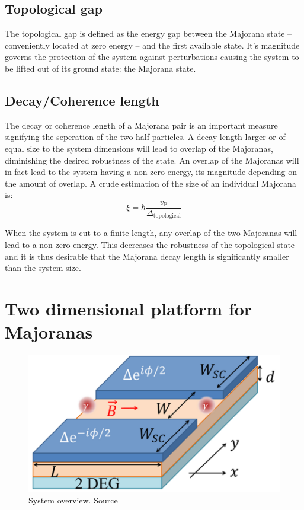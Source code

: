 	\subsection{Topological gap}
		The topological gap is defined as the energy gap between the Majorana state -- conveniently located at zero energy -- and the first available state.
		It's magnitude governs the protection of the system against perturbations causing the system to be lifted out of its ground state: the Majorana state.

	\subsection{Decay/Coherence length}
		The decay or coherence length of a Majorana pair is an important measure signifying the seperation of the two half-particles.
		A decay length larger or of equal size to the system dimensions will lead to overlap of the Majoranas, diminishing the desired robustness of the state.
		An overlap of the Majoranas will in fact lead to the system having a non-zero energy, its magnitude depending on the amount of overlap.
		A crude estimation of the size of an individual Majorana is:
		\begin{equation}
			\xi = \hbar \frac{v_\text{F}}{\Delta_\text{topological}}
			\label{eq:majorana_coherence_length}
		\end{equation}

		When the system is cut to a finite length, any overlap of the two Majoranas will lead to a non-zero energy.
		This decreases the robustness of the topological state and it is thus desirable that the Majorana decay length is significantly smaller than the system size.

\section{Two dimensional platform for Majoranas}

	\begin{figure}[!htb]
	\centering
	\includegraphics[width=0.5\columnwidth]{figures/pientka_system}
	\caption{System overview. Source\cite{pientka_topological_2017}}
	\label{fig:pientka_system}
	\end{figure}

